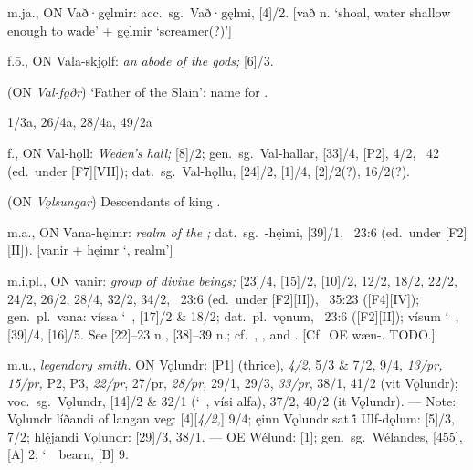 \begin{itemize}
 m.ja., ON Vað·gęlmir:
  acc.~sg.~Vað·gęlmi, [4]/2.
  [vað n. ‘shoal, water shallow enough to wade’ + gęlmir ‘screamer(?)’]

 f.ō., ON Vala-skjǫlf:
  \emph{an abode of the gods;} [6]/3.

 (ON \emph{Val-fǫðr})
  ‘Father of the Slain’; name for .

   1/3a, 26/4a, 28/4a,  49/2a

 f., ON Val-hǫll:
  \emph{Weden’s hall;} [8]/2; gen.~sg.~Val-hallar, [33]/4, [P2],  4/2, \Skaldskaparmal\ 42 (ed.~under [F7][VII]); dat.~sg.~Val-hǫllu, [24]/2, [1]/4, [2]/2(?), 16/2(?).

 (ON \emph{Vǫlsungar})
  Descendants of king .

 m.a., ON Vana-hęimr:
  \emph{realm of the ;} dat.~sg.~-hęimi, [39]/1, \Gylfaginning~23:6 (ed.~under [F2][II]).
  [vanir + hęimr ‘, realm’]

 m.i.pl., ON vanir:
  \emph{group of divine beings;} [23]/4, [15]/2, [10]/2, 12/2, 18/2, 22/2, 24/2, 26/2, 28/4, 32/2, 34/2, \Gylfaginning~23:6 (ed.~under [F2][II]),  \Gylfaginning~35:23 ([F4][IV]); gen.~pl.~vana: víssa \char`~, [17]/2 \& 18/2; dat.~pl.~vǫnum, \Gylfaginning~23:6 ([F2][II]); vísum \char`~, [39]/4, [16]/5.
  See [22]--23 n., [38]--39 n.; cf.~, , and .
  [Cf.~OE wæn-. TODO.]

 m.u.,
  \emph{legendary smith.}
  ON Vǫlundr: [P1] (thrice), \emph{4/2}, 5/3 \& 7/2, 9/4, \emph{13/pr, 15/pr,} P2, P3, \emph{22/pr}, 27/pr, \emph{28/pr,} 29/1, 29/3, \emph{33/pr}, 38/1, 41/2 (vit Vǫlundr);
  voc.~sg.~Vǫlundr, [14]/2 \& 32/1 (\char`~, vísi alfa), 37/2, 40/2 (it Vǫlundr).
  --- Note: Vǫlundr líðandi of langan veg: [4][\emph{4/2,}] 9/4; ęinn Vǫlundr sat i̇́ Ulf-dǫlum: [5]/3, 7/2; hlę́jandi Vǫlundr: [29]/3, 38/1.
  --- OE Wélund: [1]; gen.~sg.~Wélandes, [455], [A] 2; \char`~\ bearn, [B] 9.


\end{itemize}
